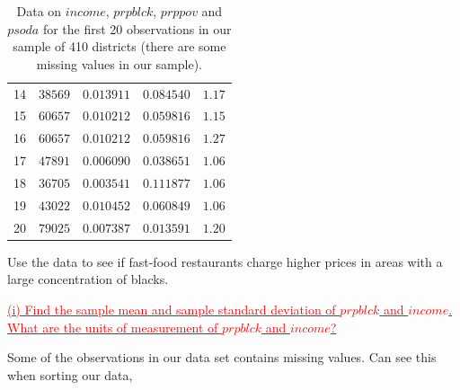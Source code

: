 \documentclass[12pt]{report}
\begin{document}
\begin{table}[H]
\begin{tabular}{lrrrr}
		\multicolumn{1}{c}{14}&\multicolumn{1}{r}{$38569$}&\multicolumn{1}{r}{$0.013911$}&\multicolumn{1}{r}{$0.084540$}&\multicolumn{1}{r}{$1.17$}\\
		\multicolumn{1}{c}{15}&\multicolumn{1}{r}{$60657$}&\multicolumn{1}{r}{$0.010212$}&\multicolumn{1}{r}{$0.059816$}&\multicolumn{1}{r}{$1.15$}\\
		\multicolumn{1}{c}{16}&\multicolumn{1}{r}{$60657$}&\multicolumn{1}{r}{$0.010212$}&\multicolumn{1}{r}{$0.059816$}&\multicolumn{1}{r}{$1.27$}\\
		\multicolumn{1}{c}{17}&\multicolumn{1}{r}{$47891$}&\multicolumn{1}{r}{$0.006090$}&\multicolumn{1}{r}{$0.038651$}&\multicolumn{1}{r}{$1.06$}\\
		\multicolumn{1}{c}{18}&\multicolumn{1}{r}{$36705$}&\multicolumn{1}{r}{$0.003541$}&\multicolumn{1}{r}{$0.111877$}&\multicolumn{1}{r}{$1.06$}\\
		\multicolumn{1}{c}{19}&\multicolumn{1}{r}{$43022$}&\multicolumn{1}{r}{$0.010452$}&\multicolumn{1}{r}{$0.060849$}&\multicolumn{1}{r}{$1.06$}\\
		\multicolumn{1}{c}{20}&\multicolumn{1}{r}{$79025$}&\multicolumn{1}{r}{$0.007387$}&\multicolumn{1}{r}{$0.013591$}&\multicolumn{1}{r}{$1.20$}\\
	\end{tabular}
	\caption{Data on $income$, $prpblck$, $prppov$ and $psoda$ for the first 20 observations in our sample of 410 districts (there are some missing values in our sample).}
\end{table}

\vspace{-\baselineskip}
\noindent Use the data to see if fast-food restaurants charge higher prices in areas with a large concentration of blacks.

\newpage
\noindent \textcolor{red}
{
	\uline{(i) Find the sample mean and sample standard deviation of $prpblck$ and $income$. What are the units of measurement of $prpblck$ and $income$?}
}

\noindent Some of the observations in our data set contains missing values. Can see this when sorting our data,
\end{document}
